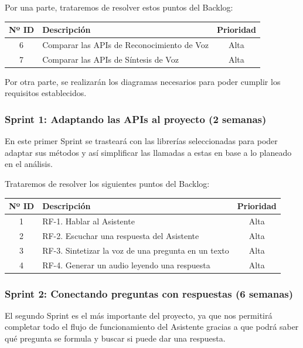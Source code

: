 Por una parte, trataremos de resolver estos puntos del Backlog:

\begin{table}[H]
	\begin{tabularx}{\textwidth}{|c|X|c|}
		\hline
		\textbf{Nº ID} & \textbf{Descripción} & \textbf{Prioridad} \\
		\hline
		6 &  Comparar las APIs de Reconocimiento de Voz & Alta \\
		\hline
		7 &  Comparar las APIs de Síntesis de Voz & Alta \\
		\hline
	\end{tabularx}
\end{table}

Por otra parte, se realizarán los diagramas necesarios para poder cumplir los requisitos establecidos.

\subsubsection{Sprint 1: Adaptando las APIs al proyecto (2 semanas)}
En este primer Sprint se trasteará con las librerías seleccionadas para poder adaptar sus métodos y así simplificar las llamadas a estas en base a lo planeado en el análisis.

Trataremos de resolver los siguientes puntos del Backlog:

\begin{table}[H]
	\begin{tabularx}{\textwidth}{|c|X|c|}
		\hline
		\textbf{Nº ID} & \textbf{Descripción} & \textbf{Prioridad} \\
		\hline
		1 & RF-1. Hablar al Asistente & Alta \\
		\hline
		2 & RF-2. Escuchar una respuesta del Asistente & Alta \\
		\hline
		3 & RF-3. Sintetizar la voz de una pregunta en un texto & Alta \\
		\hline
		4 & RF-4. Generar un audio leyendo una respuesta & Alta \\
		\hline
	\end{tabularx}
\end{table}

\subsubsection{Sprint 2: Conectando preguntas con respuestas (6 semanas)}
El segundo Sprint es el más importante del proyecto, ya que nos permitirá completar todo el flujo de funcionamiento del Asistente gracias a que podrá saber qué pregunta se formula y buscar si puede dar una respuesta.

